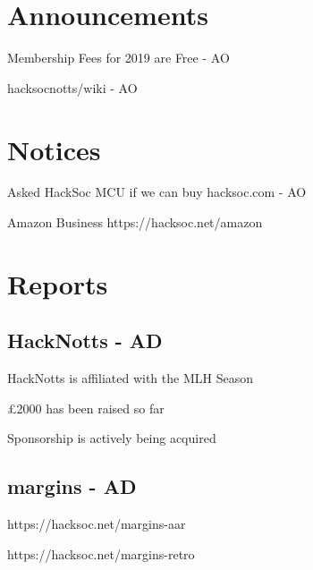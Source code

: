 \documentclass[11pt]{meetingmins}
\begin{document}
\maketitle

\section{Announcements}
\begin{items}
	\item Membership Fees for 2019 are Free - AO
	\item hacksocnotts/wiki - AO
\end{items}

\section{Notices}
\begin{items}
	\item Asked HackSoc MCU if we can buy hacksoc.com - AO
	\item Amazon Business
		\subitem https://hacksoc.net/amazon
\end{items}


\section{Reports}

\subsection{HackNotts - AD}
\begin{hiddensubitems}
	\item HackNotts is affiliated with the MLH Season
	\item \pounds2000 has been raised so far
	\item Sponsorship is actively being acquired
\end{hiddensubitems}

\subsection{margins - AD}
\begin{hiddensubitems}
	\item https://hacksoc.net/margins-aar
	\item https://hacksoc.net/margins-retro
\end{hiddensubitems}
\end{document}
